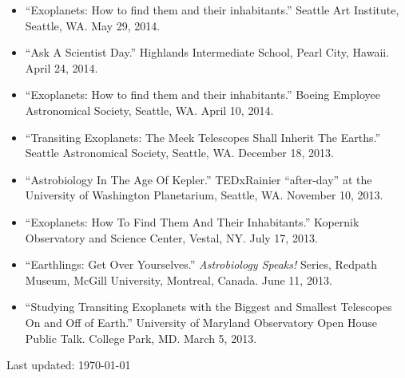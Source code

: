 \documentclass[margin]{res}
\begin{document}
\begin{resume}
\begin{itemize}
\item ``Exoplanets: How to find them and their inhabitants.'' Seattle Art Institute, Seattle, WA. May 29, 2014.

\item ``Ask A Scientist Day.'' Highlands Intermediate School, Pearl City, Hawaii. April 24, 2014.

\item ``Exoplanets: How to find them and their inhabitants.'' Boeing Employee Astronomical Society, Seattle, WA. April 10, 2014.

\item ``Transiting Exoplanets: The Meek Telescopes Shall Inherit The Earths.'' Seattle Astronomical Society, Seattle, WA. December 18, 2013.

\item ``Astrobiology In The Age Of Kepler.'' TEDxRainier ``after-day'' at the University of Washington Planetarium, Seattle, WA. November 10, 2013. 

\item ``Exoplanets: How To Find Them And Their Inhabitants.'' Kopernik Observatory and Science Center, Vestal, NY. July 17, 2013. 

\item ``Earthlings: Get Over Yourselves.'' \textit{Astrobiology Speaks!} Series, Redpath Museum, McGill University, Montreal, Canada. June 11, 2013.

\item ``Studying Transiting Exoplanets with the Biggest and Smallest Telescopes On and Off of Earth.'' University of Maryland Observatory Open House Public Talk. College Park, MD. March 5, 2013.
\end{itemize}
            
\vfill \hfill {\small Last updated: \today}
\end{resume}
\end{document}
